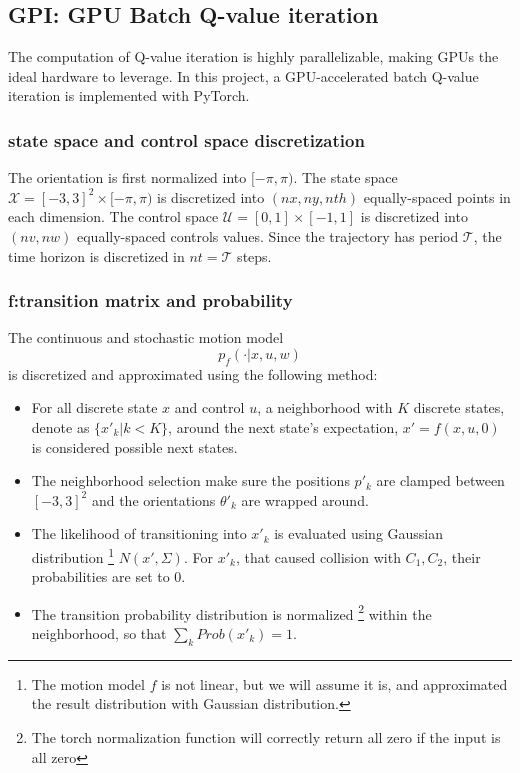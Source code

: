 \documentclass[conference]{IEEEtran}
\begin{document}
\subsection{GPI: GPU Batch Q-value iteration}
The computation of Q-value iteration is highly parallelizable, 
making GPUs the ideal hardware to leverage. 
In this project, 
a GPU-accelerated batch Q-value iteration is implemented with PyTorch.

\subsubsection{state space and control space discretization}
The orientation is first normalized into $[-\pi,\pi)$.
The state space $\mathcal{X} = [-3,3]^2\times[-\pi,\pi)$ is
discretized into $(nx, ny, nth)$ equally-spaced points in each dimension.
The control space $\mathcal{U} = [0,1]\times[-1,1]$ is discretized into $(nv,nw)$
equally-spaced controls values.
Since the trajectory has period $\mathcal{T}$, 
the time horizon is discretized in $nt=\mathcal{T}$ steps.

\subsubsection{f:transition matrix and probability}
The continuous and stochastic motion model
\[p_f(\cdot | x, u, w) \]
is discretized and approximated using the following method:

\begin{itemize}
    \item For all discrete state \( x \) and control \( u \),
    a neighborhood with $K$ discrete states, denote as \( \{x'_{k} |k < K\}\), 
    around the next state's expectation, \(x' = f(x, u, 0) \)
    is considered possible next states.
    \item The neighborhood selection make sure the positions $p'_k$ are clamped between $[-3,3]^2$
    and the orientations $\theta'_k$ are wrapped around. 
    \item  The likelihood of transitioning into \( x'_k \)
    is evaluated using Gaussian distribution
    \footnote{The motion model $f$ is not linear, but we will assume it is, and approximated 
    the result distribution with Gaussian distribution.}
    \( N(x', \Sigma) \).
    For $x'_k$, that caused collision with $C_1, C_2$, 
    their probabilities are set to 0.
    \item The transition probability distribution is normalized 
    \footnote{The torch normalization function will correctly return all zero if the input is all zero}
    within the neighborhood, so that \(\sum_k Prob(x'_{k}) = 1\).
\end{itemize}
\end{document}
